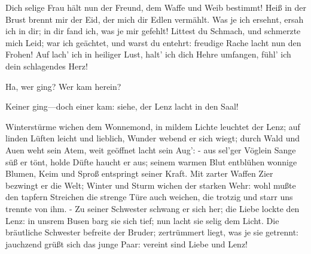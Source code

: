 \begin{drama}
\Siegmundspeaks


Dich selige Frau hält nun der Freund,
dem Waffe und Weib bestimmt!
Heiß in der Brust brennt mir der Eid,
der mich dir Edlen vermählt.
Was je ich ersehnt, ersah ich in dir;
in dir fand ich, was je mir gefehlt!
Littest du Schmach,
und schmerzte mich Leid;
war ich geächtet, und warst du entehrt:
freudige Rache lacht nun den Frohen!
Auf lach' ich in heiliger Lust,
halt' ich dich Hehre umfangen,
fühl' ich dein schlagendes Herz!
 




\Sieglindespeaks


Ha, wer ging? Wer kam herein?
 




\Siegmundspeaks


Keiner ging---doch einer kam:
siehe, der Lenz lacht in den Saal!
 



Winterstürme wichen
dem Wonnemond,
in mildem Lichte leuchtet der Lenz;
auf linden Lüften leicht und lieblich,
Wunder webend er sich wiegt;
durch Wald und Auen weht sein Atem,
weit geöffnet lacht sein Aug': -
aus sel'ger Vöglein Sange süß er tönt,
holde Düfte haucht er aus;
seinem warmen Blut entblühen wonnige Blumen,
Keim und Sproß entspringt seiner Kraft.
Mit zarter Waffen Zier bezwingt er die Welt;
Winter und Sturm wichen der starken Wehr:
wohl mußte den tapfern Streichen
die strenge Türe auch weichen,
die trotzig und starr uns trennte von ihm. -
Zu seiner Schwester schwang er sich her;
die Liebe lockte den Lenz:
in unsrem Busen barg sie sich tief;
nun lacht sie selig dem Licht.
Die bräutliche Schwester befreite der Bruder;
zertrümmert liegt, was je sie getrennt:
jauchzend grüßt sich das junge Paar:
vereint sind Liebe und Lenz!
 


\end{drama}
